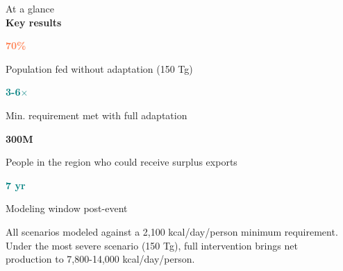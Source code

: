 \documentclass[final]{beamer}
\newlength{\sepwidth}
\newlength{\colwidth}
\newenvironment{labelblock}[2]{%
  \begin{block}{%
      {\small\color{structure.fg!70!bg}#1}%
      \\[2pt]                                  %
      {\large\bfseries#2}%
      }%
      }{%
  \end{block}%
  }
\newcommand{\separatorcolumn}{\begin{column}{\sepwidth}\end{column}}
\begin{document}
\begin{frame}[t]
\begin{columns}[t]
    \separatorcolumn

    \begin{column}{\colwidth}
      \begin{labelblock}{At a glance}{Key results}

        \noindent
        \begin{minipage}[t]{0.48\linewidth}
          \centering
          {\sffamily\fontsize{22}{26}\selectfont\bfseries\textcolor{coral}{70\%}}\par
          \vspace{2pt}
          {\sffamily\footnotesize\color{black!70}Population fed without adaptation (150 Tg)}
        \end{minipage}\hfill
        \begin{minipage}[t]{0.48\linewidth}
          \centering
          {\sffamily\fontsize{22}{26}\selectfont\bfseries\textcolor{teal}{3-6$\times$}}\par
          \vspace{2pt}
          {\sffamily\footnotesize\color{black!70}Min. requirement met with full adaptation}
        \end{minipage}

        \vspace{6pt}

        \noindent
        \begin{minipage}[t]{0.48\linewidth}
          \centering
          {\sffamily\fontsize{22}{26}\selectfont\bfseries\textcolor{amber}{300M}}\par
          \vspace{2pt}
          {\sffamily\footnotesize\color{black!70}People in the region who could receive surplus exports}
        \end{minipage}\hfill
        \begin{minipage}[t]{0.48\linewidth}
          \centering
          {\sffamily\fontsize{22}{26}\selectfont\bfseries\textcolor{teal}{7 yr}}\par
          \vspace{2pt}
          {\sffamily\footnotesize\color{black!70}Modeling window post-event}
        \end{minipage}

        \vspace{6pt}
        \small
        All scenarios modeled against a 2,100 kcal/day/person minimum requirement. Under the most severe scenario (150 Tg), full intervention brings net production to 7,800-14,000 kcal/day/person.
      \end{labelblock}
    \end{column}


\end{columns}
\end{frame}
\end{document}
